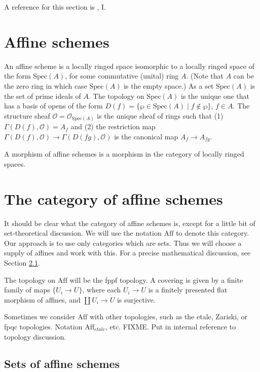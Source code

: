 \smallskip\noindent
A reference for this section is \cite{EGA}, I.

\section{Affine schemes}
\label{section-affine-schemes}

\noindent
An affine scheme is a locally ringed space isomorphic to a locally ringed
space of the form $\text{Spec}(A)$, for some commutative (unital) ring $A$.
(Note that $A$ can be the zero ring in which case $\text{Spec}(A)$ is
the empty space.) As a set $\text{Spec}(A)$ is the set of prime ideals of
$A$. The topology on $\text{Spec}(A)$ is the unique one that has a basis
of opens of the form $D(f) = \{ \wp \in\text{Spec}(A) \mid
f \not\in \wp \}$,
$f\in A$. The structure sheaf $\mathcal{O} = 
\mathcal{O}_{\text{Spec}(A)}$ is the unique
sheaf of rings such that (1) $\Gamma(D(f), \mathcal{O}) = A_f$ and
(2) the restriction map $\Gamma(D(f), \mathcal{O}) \to \Gamma(D(fg),
\mathcal{O})$ is the canonical map $A_f \to A_{fg}$.

\smallskip\noindent
A morphism of affine schemes is a morphism in the category of locally ringed 
spaces.

\section{The category of affine schemes}
\label{section-category-affine-schemes}

\noindent
It should be clear what the category of affine schemes is, except for a
little bit of set-theoretical discussion. We will use the notation
$\text{Aff}$ to denote this category. Our approach is to use only
categories which are sets. Thus we will choose a supply of affines and
work with this. For a precise mathematical discussion, see
Section \ref{section-sets-of-affines}.

\smallskip\noindent
The topology on $\text{Aff}$ will be the fppf topology. A covering is
given by a finite family of maps $\{U_i \to U\}$, where each $U_i \to U$
is a finitely presented flat morphism of affines, and $\coprod U_i \to U$
is surjective. 

\smallskip\noindent
Sometimes we consider $\text{Aff}$ with other topologies, such as the
etale, Zariski, or fpqc topologies. Notation $\text{Aff}_{etale}$, etc.
FIXME. Put in internal reference to topology discussion.

\subsection{Sets of affine schemes}
\label{section-sets-of-affines}

